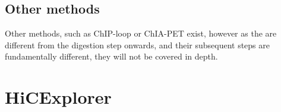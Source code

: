 \subsection{Other methods}\label{sec:other3c}

Other methods, such as ChIP-loop or ChIA-PET exist, however as the are
different from the digestion step onwards, and their subsequent steps are
fundamentally different, they will not be covered in depth.





%
%
%
%
%
%






\section{HiCExplorer}\label{sec:hicexplorer}



